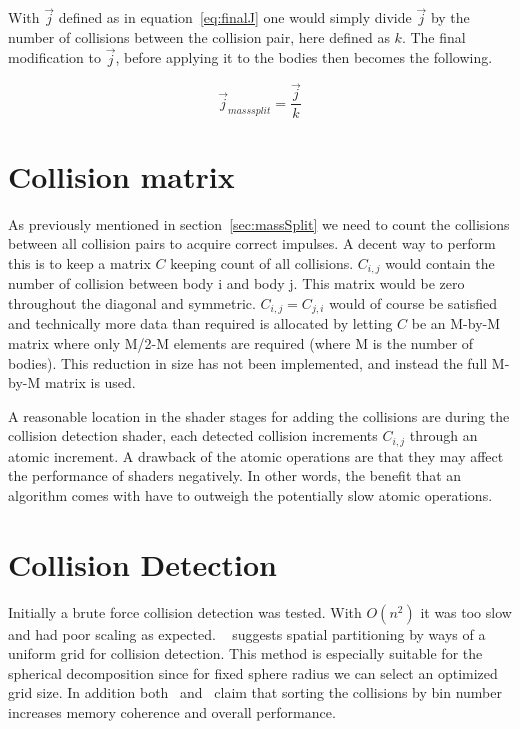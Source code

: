 With $\vec{j}$ defined as in equation~\ref{eq:finalJ} one would simply divide $\vec{j}$ by
the number of collisions between the collision pair, here defined as $k$. The final modification to
$\vec{j}$, before applying it to the bodies then becomes the following.

\begin{equation}
  \vec{j}_{mass split} = \frac{\vec{j}}{k}
\end{equation}

\section{Collision matrix}\label{sec:colMatrix}
As previously mentioned in section~\ref{sec:massSplit} we need to count the collisions
between all collision pairs to acquire correct impulses. A decent way to perform
this is to keep a matrix $C$ keeping count of all collisions. $C_{i,j}$ would
contain the number of collision between body i and body j. This matrix would be
zero throughout the diagonal and symmetric. $C_{i,j} = C_{j,i}$ would of course
be satisfied and technically more data than required is allocated by letting $C$
be an M-by-M matrix where only M/2-M elements are required (where M is the
number of bodies). This reduction in size
has not been implemented, and instead the full M-by-M matrix is used.

A reasonable location in the shader stages for adding the collisions are during
the collision detection shader, each detected collision increments $C_{i,j}$
 through an atomic increment. A drawback of the atomic
 operations are that they may affect the performance of shaders negatively. In
 other words, the benefit that an algorithm comes with have to outweigh the potentially
 slow atomic operations.

\section{Collision Detection}
Initially a brute force collision detection was tested. With $O(n^2)$ it was too
slow and had poor scaling as expected. ~\cite{gpugems} suggests spatial partitioning
by ways of a uniform grid for collision detection. This method is especially suitable
for the spherical decomposition since for fixed sphere radius we can select an optimized
grid size. In addition both~\cite{gpugems} and~\cite{fastnearest} claim that sorting
the collisions by bin number increases memory coherence and overall performance.

